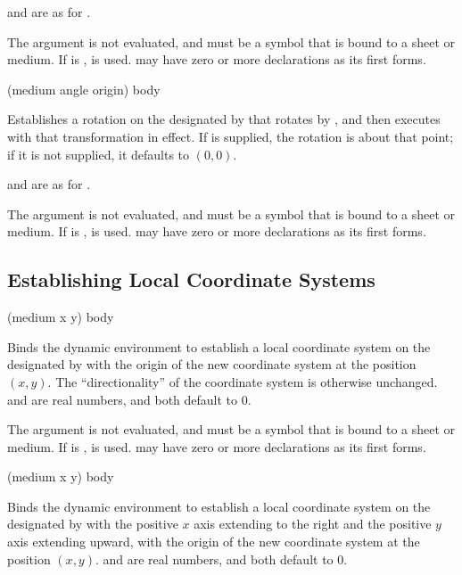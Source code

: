  and  are as for .

The  argument is not evaluated, and must be a symbol that is bound
to a sheet or medium.  If  is ,  is
used.   may have zero or more declarations as its first forms.

 {(medium angle \optional origin) \body body}

Establishes a rotation on the  designated by  that
rotates by , and then executes  with that transformation in
effect.  If  is supplied, the rotation is about that point; if it is
not supplied, it defaults to $(0,0)$.

 and  are as for .

The  argument is not evaluated, and must be a symbol that is bound
to a sheet or medium.  If  is ,  is
used.   may have zero or more declarations as its first forms.


\subsection {Establishing Local Coordinate Systems}

 {(medium \optional x y) \body body}

Binds the dynamic environment to establish a local coordinate system on the
 designated by  with the origin of the new coordinate
system at the position $(x,y)$.  The ``directionality'' of the coordinate system
is otherwise unchanged.   and  are real numbers, and both default
to 0.

The  argument is not evaluated, and must be a symbol that is bound
to a sheet or medium.  If  is ,  is
used.   may have zero or more declarations as its first forms.

 {(medium \optional x y) \body body}

Binds the dynamic environment to establish a local coordinate system on the
 designated by  with the positive $x$ axis extending to
the right and the positive $y$ axis extending upward, with the origin of the new
coordinate system at the position $(x,y)$.   and  are real
numbers, and both default to 0.

